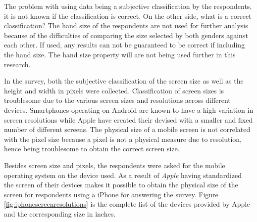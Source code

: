    The problem with using data being a subjective classification by the respondents, it is not known if the classification is correct. On the other side, what is a correct classification? The hand size of the respondents are not used for further analysis because of the difficulties of comparing the size selected by both genders against each other. If used, any results can not be guaranteed to be correct if including the hand size. The hand size property will are not being used further in this research.

    In the survey, both the subjective classification of the screen size as well as the height and width in pixels were collected. Classification of screen sizes is troublesome due to the various screen sizes and resolutions across different devices. Smartphones operating on Android are known to have a high variation in screen resolutions while Apple have created their devised with a smaller and fixed number of different screens. The physical size of a mobile screen is not correlated with the pixel size because a pixel is not a physical measure due to resolution, hence being troublesome to obtain the correct screen size. 

    Besides screen size and pixels, the respondents were asked for the mobile operating system on the device used. As a result of {\it Apple} having standardized the screen of their devices makes it possible to obtain the physical size of the screen for respondents using a iPhone for answering the survey. Figure \ref{fig:iphonescreenresolutions} is the complete list of the devices provided by Apple and the corresponding size in inches. 

